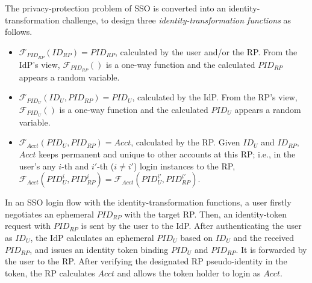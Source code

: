The privacy-protection problem of SSO is converted into an identity-transformation challenge,
 to design three \emph{identity-transformation functions} as follows.
\begin{itemize}
\item
$\mathcal{F}_{PID_{RP}}(ID_{RP}) = PID_{RP}$, calculated by the user and/or the RP.
From the IdP's view,
$\mathcal{F}_{PID_{RP}}()$ is a one-way function and the calculated $PID_{RP}$ appears a random variable.
\item
$\mathcal{F}_{PID_U}(ID_U, PID_{RP}) = PID_{U}$, calculated by the IdP.
From the RP's view,
    $\mathcal{F}_{PID_U}()$ is a one-way function and the calculated $PID_{U}$ appears a random variable.
\item
$\mathcal{F}_{Acct}(PID_{U}, PID_{RP}) = Acct$, calculated by the RP.
Given $ID_U$ and $ID_{RP}$, $Acct$ keeps permanent and unique to other accounts at this RP;
    i.e., in the user's any $i$-th and $i'$-th ($i \neq i'$) login instances to the RP,
 $\mathcal{F}_{Acct}(PID_{U}^i, PID_{RP}^i) = \mathcal{F}_{Acct}(PID_{U}^{i'}, PID_{RP}^{i'})$.
\end{itemize}


In an SSO login flow with the identity-transformation functions,
    a user firstly negotiates an ephemeral $PID_{RP}$ with the target RP.
Then, an identity-token request with $PID_{RP}$ is sent by the user to the IdP.
After authenticating the user as $ID_U$, the IdP calculates an ephemeral $PID_U$ based on $ID_U$ and the received $PID_{RP}$,
    and issues an identity token binding $PID_U$ and $PID_{RP}$.
It is forwarded by the user to the RP.
After verifying the designated RP pseudo-identity in the token,
    the RP calculates $Acct$ and allows the token holder to login as $Acct$.


